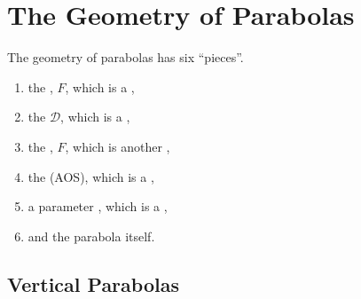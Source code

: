 \section{The Geometry of Parabolas}

The geometry of parabolas has six ``pieces''.
\begin{enumerate}[nosep]
    \item the , $F$, which is a ,
    \item the  $\mathscr{D}$, which is a ,
    \item the , $F$, which is another ,
    \item the    (AOS), which is a ,
    \item a parameter , which is a ,
    \item and the parabola itself.
\end{enumerate}

\subsection{Vertical Parabolas} 


